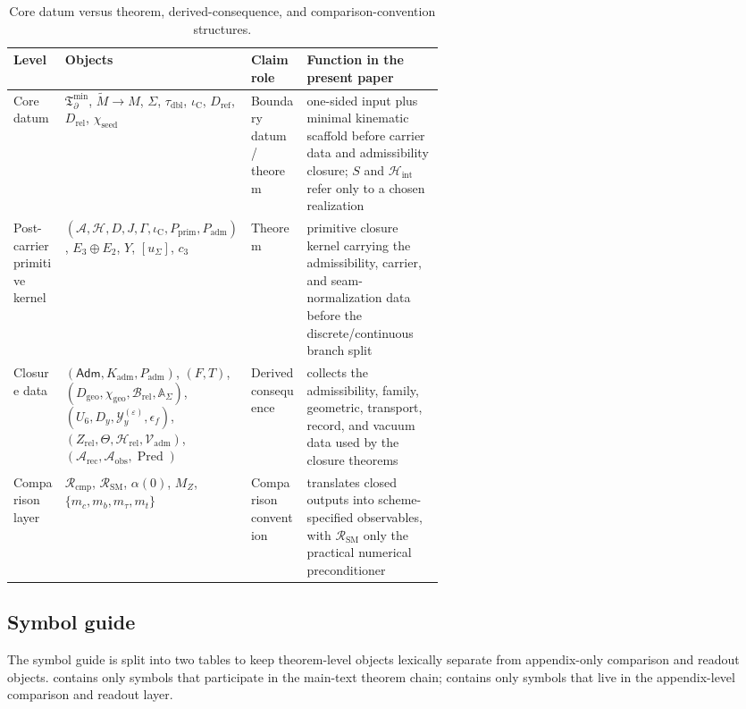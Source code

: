 \documentclass[11pt,a4paper]{article}
\theoremstyle{definition}
\theoremstyle{remark}
\newcommand{\Seam}{\Sigma}
\newcommand{\taudbl}{\tau_{\mathrm{dbl}}}
\newcommand{\iC}{\iota_{\mathrm C}}
\newcommand{\cthree}{c_3}
\newcommand{\SM}{\mathrm{SM}}
\newcommand{\Arec}{\mathcal A_{\mathrm{rec}}}
\newcommand{\Aobs}{\mathcal A_{\mathrm{obs}}}
\newcommand{\Vadm}{\mathcal V_{\mathrm{adm}}}
\newcommand{\Hrel}{\mathcal H_{\mathrm{rel}}}
\newcommand{\Pred}{\operatorname{Pred}}
\newcommand{\Hint}{\mathcal H_{\mathrm{int}}}
\newcommand{\Kadm}{K_{\mathrm{adm}}}
\newcommand{\Tbound}{\mathfrak T_{\partial}^{\min}}
\newcommand{\chiseed}{\chi_{\mathrm{seed}}}
\newcommand{\chigeo}{\chi_{\mathrm{geo}}}
\newcommand{\Padm}{P_{\mathrm{adm}}}
\newcommand{\Pprim}{P_{\mathrm{prim}}}
\begin{document}
\begin{table}[t]
\centering
\small
\begin{tabularx}{\linewidth}{@{}>{\raggedright\arraybackslash}p{0.12\linewidth}>{\raggedright\arraybackslash}p{0.31\linewidth}>{\raggedright\arraybackslash}p{0.13\linewidth}Y@{}}
\toprule
Level & Objects & Claim role & Function in the present paper \\
\midrule
Core datum & $\Tbound$, $\widetilde M\to M$, $\Seam$, $\taudbl$, $\iC$, $D_{\mathrm{ref}}$, $D_{\mathrm{rel}}$, $\chiseed$ & Boundary datum / theorem & one-sided input plus minimal kinematic scaffold before carrier data and admissibility closure; $S$ and $\Hint$ refer only to a chosen realization \\
Post-carrier primitive kernel & $(\mathcal A,\mathcal H,D,J,\Gamma,\iC,\Pprim,\Padm)$, $E_3\oplus E_2$, $Y$, $[u_\Sigma]$, $\cthree$ & Theorem & primitive closure kernel carrying the admissibility, carrier, and seam-normalization data before the discrete/continuous branch split \\
Closure data & $(\mathsf{Adm},\Kadm,\Padm)$, $(F,T)$, $(D_{\mathrm{geo}},\chigeo,\mathcal B_{\mathrm{rel}},\mathbb A_{\Seam})$, $(U_6,D_y,\mathcal Y_y^{(\varepsilon)},\epsilon_f)$, $(Z_{\mathrm{rel}},\Theta,\Hrel,\Vadm)$, $(\Arec,\Aobs,\Pred)$ & Derived consequence & collects the admissibility, family, geometric, transport, record, and vacuum data used by the closure theorems \\
Comparison layer & $\mathcal R_{\mathrm{cmp}}$, $\mathcal R_{\SM}$, $\alpha(0)$, $M_Z$, $\{m_c,m_b,m_\tau,m_t\}$ & Comparison convention & translates closed outputs into scheme-specified observables, with $\mathcal R_{\SM}$ only the practical numerical preconditioner \\
\bottomrule
\end{tabularx}
\caption{Core datum versus theorem, derived-consequence, and comparison-convention structures.}
\label{tab:layered-datum}
\end{table}

\subsection{Symbol guide}

The symbol guide is split into two tables to keep theorem-level objects lexically separate from
appendix-only comparison and readout objects.  contains only
symbols that participate in the main-text theorem chain; 
contains only symbols that live in the appendix-level comparison and readout layer.
\end{document}
